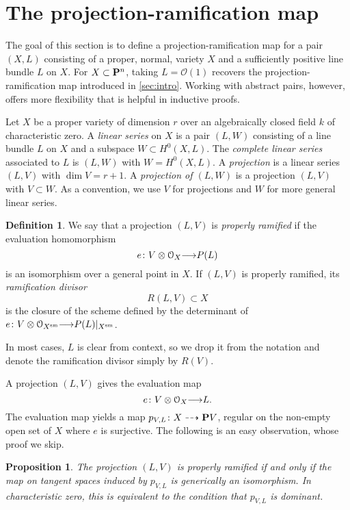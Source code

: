 \documentclass[11pt,reqno]{amsart}
\theoremstyle{plain}
\newtheorem{proposition}[theorem]{Proposition}
\theoremstyle{definition}
\newtheorem{definition}[theorem]{Definition}
\theoremstyle{remark}
\numberwithin{equation}{section}
\renewcommand{\to}{{\longrightarrow}}
\numberwithin{equation}{section}
\renewcommand{\O}{\mathcal O}
\begin{document}
\section{The projection-ramification map}\label{sec:prmap}
The goal of this section is to define a projection-ramification map for a pair $(X, L)$ consisting of a proper, normal, variety $X$ and a sufficiently positive line bundle $L$ on $X$.
For $X \subset \P^n$, taking $L = \O(1)$ recovers the projection-ramification map introduced in \autoref{sec:intro}.
Working with abstract pairs, however, offers more flexibility that is helpful in inductive proofs.

Let $X$ be a proper variety of dimension $r$ over an algebraically closed field $k$ of characteristic zero.
A \emph{linear series} on $X$ is a pair $(L, W)$ consisting of a line bundle $L$ on $X$ and a subspace $W \subset H^0(X, L)$.
The \emph{complete linear series} associated to $L$ is $(L, W)$ with $W = H^0(X, L)$.
A \emph{projection} is a linear series $(L, V)$ with $\dim V = r+1$.
A \emph{projection of $(L, W)$} is a projection $(L, V)$ with $V \subset W$.
As a convention, we use $V$ for projections and $W$ for more general linear series.

\begin{definition}  \label{definition:properlyramified}
We say that a projection $(L,V)$ is \emph{properly ramified} if the evaluation homomorphism
\[e \from V \otimes \O_{X} \to P(L)\]
is an isomorphism over a general point in $X$.  If $(L,V)$ is properly ramified, its \emph{ramification divisor}
\[R(L,V) \subset X\]
is the closure of the scheme defined by the determinant of $e \from V \otimes \O_{X^{\rm sm}} \to P(L)|_{X^{\rm sm}}$.
\end{definition}
In most cases, $L$ is clear from context, so we drop it from the notation and denote the ramification divisor simply by $R(V)$.

A projection $(L, V)$ gives the evaluation map
\[e \from V \otimes \O_X \to L.\]
The evaluation map yields a map $p_{V,L} \from X \dashrightarrow \P V$, regular on the non-empty open set of $X$ where $e$ is surjective.
The following is an easy observation, whose proof we skip.
\begin{proposition}\label{prop:proj}
  The projection $(L, V)$ is properly ramified if and only if the map on tangent spaces induced by $p_{V,L}$ is generically an isomorphism.
  In characteristic zero, this is equivalent to the condition that $p_{V,L}$ is dominant.
\end{proposition}
\end{document}
